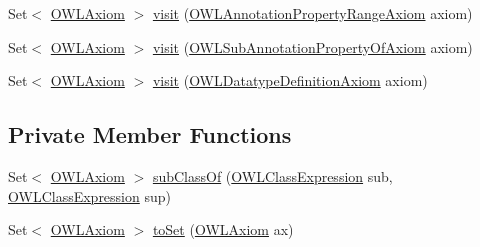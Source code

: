 \begin{DoxyCompactItemize}
\item 
Set$<$ \hyperlink{interfaceorg_1_1semanticweb_1_1owlapi_1_1model_1_1_o_w_l_axiom}{O\-W\-L\-Axiom} $>$ \hyperlink{classorg_1_1semanticweb_1_1owlapi_1_1util_1_1_structural_transformation_1_1_axiom_rewriter_a3d0eeb58dc6dc19107aebc1367c208b0}{visit} (\hyperlink{interfaceorg_1_1semanticweb_1_1owlapi_1_1model_1_1_o_w_l_annotation_property_range_axiom}{O\-W\-L\-Annotation\-Property\-Range\-Axiom} axiom)
\item 
Set$<$ \hyperlink{interfaceorg_1_1semanticweb_1_1owlapi_1_1model_1_1_o_w_l_axiom}{O\-W\-L\-Axiom} $>$ \hyperlink{classorg_1_1semanticweb_1_1owlapi_1_1util_1_1_structural_transformation_1_1_axiom_rewriter_aa08db0be616183fef3ef6706c38bde0b}{visit} (\hyperlink{interfaceorg_1_1semanticweb_1_1owlapi_1_1model_1_1_o_w_l_sub_annotation_property_of_axiom}{O\-W\-L\-Sub\-Annotation\-Property\-Of\-Axiom} axiom)
\item 
Set$<$ \hyperlink{interfaceorg_1_1semanticweb_1_1owlapi_1_1model_1_1_o_w_l_axiom}{O\-W\-L\-Axiom} $>$ \hyperlink{classorg_1_1semanticweb_1_1owlapi_1_1util_1_1_structural_transformation_1_1_axiom_rewriter_a6790e5f9103a73941d56f2a159e2659a}{visit} (\hyperlink{interfaceorg_1_1semanticweb_1_1owlapi_1_1model_1_1_o_w_l_datatype_definition_axiom}{O\-W\-L\-Datatype\-Definition\-Axiom} axiom)
\end{DoxyCompactItemize}
\subsection*{Private Member Functions}
\begin{DoxyCompactItemize}
\item 
Set$<$ \hyperlink{interfaceorg_1_1semanticweb_1_1owlapi_1_1model_1_1_o_w_l_axiom}{O\-W\-L\-Axiom} $>$ \hyperlink{classorg_1_1semanticweb_1_1owlapi_1_1util_1_1_structural_transformation_1_1_axiom_rewriter_ab45c32022bc0616b879b53899d388711}{sub\-Class\-Of} (\hyperlink{interfaceorg_1_1semanticweb_1_1owlapi_1_1model_1_1_o_w_l_class_expression}{O\-W\-L\-Class\-Expression} sub, \hyperlink{interfaceorg_1_1semanticweb_1_1owlapi_1_1model_1_1_o_w_l_class_expression}{O\-W\-L\-Class\-Expression} sup)
\item 
Set$<$ \hyperlink{interfaceorg_1_1semanticweb_1_1owlapi_1_1model_1_1_o_w_l_axiom}{O\-W\-L\-Axiom} $>$ \hyperlink{classorg_1_1semanticweb_1_1owlapi_1_1util_1_1_structural_transformation_1_1_axiom_rewriter_a5c592e0016891dce554442c37555c459}{to\-Set} (\hyperlink{interfaceorg_1_1semanticweb_1_1owlapi_1_1model_1_1_o_w_l_axiom}{O\-W\-L\-Axiom} ax)
\end{DoxyCompactItemize}


